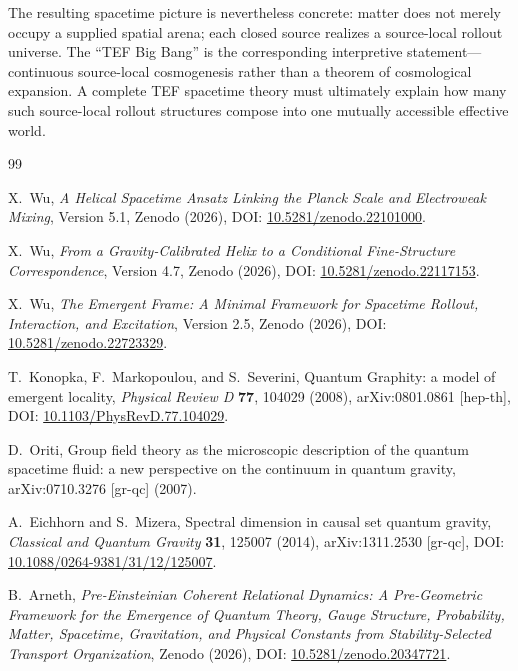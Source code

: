 \documentclass[11pt]{article}
\begin{document}
The resulting spacetime picture is nevertheless concrete: matter does not merely occupy a supplied spatial arena; each closed source realizes a source-local rollout universe. The ``TEF Big Bang'' is the corresponding interpretive statement---continuous source-local cosmogenesis rather than a theorem of cosmological expansion. A complete TEF spacetime theory must ultimately explain how many such source-local rollout structures compose into one mutually accessible effective world.

\begin{thebibliography}{99}

X.~Wu,
\newblock \emph{A Helical Spacetime Ansatz Linking the Planck Scale and Electroweak Mixing},
\newblock Version 5.1, Zenodo (2026), DOI:
\href{https://doi.org/10.5281/zenodo.22101000}{10.5281/zenodo.22101000}.

X.~Wu,
\newblock \emph{From a Gravity-Calibrated Helix to a Conditional Fine-Structure Correspondence},
\newblock Version 4.7, Zenodo (2026), DOI:
\href{https://doi.org/10.5281/zenodo.22117153}{10.5281/zenodo.22117153}.

X.~Wu,
\newblock \emph{The Emergent Frame: A Minimal Framework for Spacetime Rollout, Interaction, and Excitation},
\newblock Version 2.5, Zenodo (2026), DOI:
\href{https://doi.org/10.5281/zenodo.22723329}{10.5281/zenodo.22723329}.


T.~Konopka, F.~Markopoulou, and S.~Severini,
\newblock Quantum Graphity: a model of emergent locality,
\newblock \emph{Physical Review D} \textbf{77}, 104029 (2008),
\newblock arXiv:0801.0861 [hep-th],
DOI: \href{https://doi.org/10.1103/PhysRevD.77.104029}{10.1103/PhysRevD.77.104029}.

D.~Oriti,
\newblock Group field theory as the microscopic description of the quantum spacetime fluid: a new perspective on the continuum in quantum gravity,
\newblock arXiv:0710.3276 [gr-qc] (2007).

A.~Eichhorn and S.~Mizera,
\newblock Spectral dimension in causal set quantum gravity,
\newblock \emph{Classical and Quantum Gravity} \textbf{31}, 125007 (2014),
\newblock arXiv:1311.2530 [gr-qc],
DOI: \href{https://doi.org/10.1088/0264-9381/31/12/125007}{10.1088/0264-9381/31/12/125007}.

B.~Arneth,
\newblock \emph{Pre-Einsteinian Coherent Relational Dynamics: A Pre-Geometric Framework for the Emergence of Quantum Theory, Gauge Structure, Probability, Matter, Spacetime, Gravitation, and Physical Constants from Stability-Selected Transport Organization},
\newblock Zenodo (2026),
DOI: \href{https://doi.org/10.5281/zenodo.20347721}{10.5281/zenodo.20347721}.


\end{thebibliography}
\end{document}

